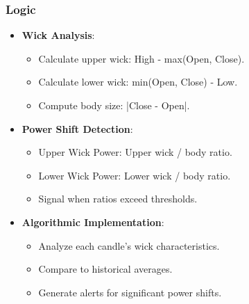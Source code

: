 \documentclass[12pt]{article}
\begin{document}
\subsubsection{Logic}
\begin{itemize}
\item \textbf{Wick Analysis}:
  \begin{itemize}
  \item Calculate upper wick: High - max(Open, Close).
  \item Calculate lower wick: min(Open, Close) - Low.
  \item Compute body size: |Close - Open|.
  \end{itemize}
\item \textbf{Power Shift Detection}:
  \begin{itemize}
  \item Upper Wick Power: Upper wick / body ratio.
  \item Lower Wick Power: Lower wick / body ratio.
  \item Signal when ratios exceed thresholds.
  \end{itemize}
\item \textbf{Algorithmic Implementation}:
  \begin{itemize}
  \item Analyze each candle's wick characteristics.
  \item Compare to historical averages.
  \item Generate alerts for significant power shifts.
  \end{itemize}
\end{itemize}
\end{document}
